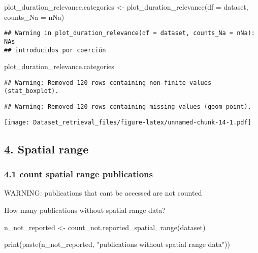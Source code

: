 \documentclass[
]{article}
\newenvironment{Shaded}{\begin{snugshade}}{\end{snugshade}}
\newcommand{\AttributeTok}[1]{\textcolor[rgb]{0.77,0.63,0.00}{#1}}
\newcommand{\FunctionTok}[1]{\textcolor[rgb]{0.00,0.00,0.00}{#1}}
\newcommand{\NormalTok}[1]{#1}
\newcommand{\OtherTok}[1]{\textcolor[rgb]{0.56,0.35,0.01}{#1}}
\newcommand{\StringTok}[1]{\textcolor[rgb]{0.31,0.60,0.02}{#1}}
\begin{document}
\begin{Shaded}
\begin{Highlighting}[]
\NormalTok{plot\_duration\_relevance.categories }\OtherTok{\textless{}{-}} \FunctionTok{plot\_duration\_relevance}\NormalTok{(}\AttributeTok{df =}\NormalTok{ dataset,}
                                                              \AttributeTok{counts\_Na =}\NormalTok{ nNa)}
\end{Highlighting}
\end{Shaded}

\begin{verbatim}
## Warning in plot_duration_relevance(df = dataset, counts_Na = nNa): NAs
## introducidos por coerción
\end{verbatim}

\begin{Shaded}
\begin{Highlighting}[]
\NormalTok{plot\_duration\_relevance.categories}
\end{Highlighting}
\end{Shaded}

\begin{verbatim}
## Warning: Removed 120 rows containing non-finite values (stat_boxplot).
\end{verbatim}

\begin{verbatim}
## Warning: Removed 120 rows containing missing values (geom_point).
\end{verbatim}

\texttt{[image: Dataset\_retrieval\_files/figure-latex/unnamed-chunk-14-1.pdf]}

\hypertarget{spatial-range}{%
\subsection{4. Spatial range}\label{spatial-range}}

\hypertarget{count-spatial-range-publications}{%
\subsubsection{4.1 count spatial range
publications}\label{count-spatial-range-publications}}

WARNING: publications that cant be accessed are not counted

How many publications without spatial range data?

\begin{Shaded}
\begin{Highlighting}[]
\NormalTok{n\_not\_reported }\OtherTok{\textless{}{-}} \FunctionTok{count\_not.reported\_spatial\_range}\NormalTok{(dataset)}

\FunctionTok{print}\NormalTok{(}\FunctionTok{paste}\NormalTok{(n\_not\_reported, }\StringTok{"publications without spatial range data"}\NormalTok{))}
\end{Highlighting}
\end{Shaded}
\end{document}
